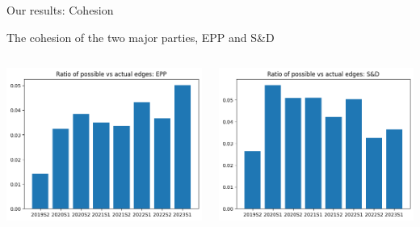 \documentclass{beamer}
\begin{document}
\begin{frame}{Our results: Cohesion}
	
	The cohesion of the two major parties, EPP and S\&D
	
	\pause
	
	\vspace{0.5cm}
	
	\begin{columns}
		
		\begin{column}{0.5\textwidth}
			\includegraphics[width=\textwidth]{img/coh_epp.png}
		\end{column}
	
		\begin{column}{0.5\textwidth}
			\includegraphics[width=\textwidth]{img/coh_s&d.png}
		\end{column}
		
	\end{columns}
\end{frame}
\end{document}
